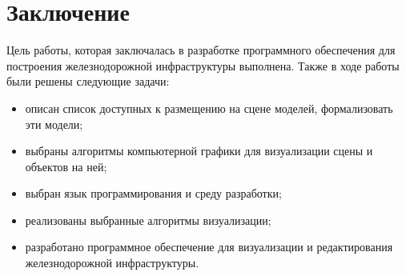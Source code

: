 \chapter*{Заключение}

Цель работы, которая заключалась в разработке программного обеспечения для построения
железнодорожной инфраструктуры выполнена. Также в ходе работы были решены следующие задачи:
\begin{itemize}
    \item описан список доступных к размещению на сцене моделей, формализовать эти модели;
    \item выбраны алгоритмы компьютерной графики для визуализации сцены и
    объектов на ней;
    \item выбран язык программирования и среду разработки;
    \item реализованы выбранные алгоритмы визуализации;
    \item разработано программное обеспечение для визуализации и редактирования
    железнодорожной инфраструктуры.
\end{itemize}